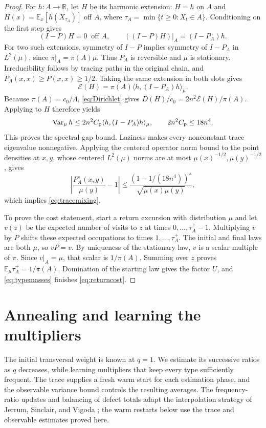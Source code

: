 \documentclass[11pt]{article}
\theoremstyle{definition}
\newcommand{\E}{\mathbb E}
\newcommand{\R}{\mathbb R}
\newcommand{\Var}{\operatorname{Var}}
\newcommand{\calE}{\mathcal E}
\newcommand{\inner}[2]{\langle #1,#2\rangle}
\begin{document}
\begin{proof}
For $h:A\to\R$, let $H$ be its harmonic extension: $H=h$ on $A$ and
$H(x)=\E_x[h(X_{\tau_A})]$ off $A$, where
$\tau_A=\min\{t\ge0:X_t\in A\}$.  Conditioning on the first step gives
\[
 (I-P)H=0\ \text{ off }A,\qquad
 ((I-P)H)|_A=(I-P_A)h.
\]
For two such extensions, symmetry of $I-P$ implies symmetry of
$I-P_A$ in $L^2(\mu)$, since $\pi|_A=\pi(A)\mu$.  Thus $P_A$ is
reversible and $\mu$ is stationary.  Irreducibility follows by tracing
paths in the original chain, and $P_A(x,x)\ge P(x,x)\ge1/2$.
Taking the same extension in both slots gives
\begin{equation}\label{eq:traceenergy}
 \calE(H)=\pi(A)\inner{h}{(I-P_A)h}_\mu.
\end{equation}
Because $\pi(A)=c_0/\Lambda$, \eqref{eq:Dirichlet} gives
$D(H)/c_0=2n^2\calE(H)/\pi(A)$.  Applying
 to $H$ therefore yields
\[
 \Var_\mu h\le2n^2C_{\rm p}\inner{h}{(I-P_A)h}_\mu,
 \qquad 2n^2C_{\rm p}\le18n^4.
\]
This proves the spectral-gap bound.  Laziness makes every nonconstant
trace eigenvalue nonnegative.  Applying the centered operator norm
bound to the point densities at $x,y$, whose centered $L^2(\mu)$ norms
are at most $\mu(x)^{-1/2},\mu(y)^{-1/2}$, gives
\[
 \left|\frac{P_A^s(x,y)}{\mu(y)}-1\right|
 \le\frac{(1-1/(18n^4))^s}{\sqrt{\mu(x)\mu(y)}},
\]
which implies \eqref{eq:tracemixing}.

To prove the cost statement, start a return excursion with distribution
$\mu$ and let $v(z)$ be the expected number of visits to $z$ at times
$0,\ldots,\tau_A^+-1$.  Multiplying $v$ by $P$ shifts these expected
occupations to times $1,\ldots,\tau_A^+$.  The initial and final laws
are both $\mu$, so $vP=v$.  By uniqueness of the stationary law, $v$ is
a scalar multiple of $\pi$.  Since $v|_A=\mu$, that scalar is
$1/\pi(A)$.  Summing over $z$ proves
$\E_\mu\tau_A^+=1/\pi(A)$.  Domination of the starting law gives the
factor $U$, and \eqref{eq:typemasses} finishes \eqref{eq:returncost}.
\end{proof}

\section{Annealing and learning the multipliers}\label{sec:algorithm}

The initial transversal weight is known at $q=1$.  We estimate its
successive ratios as $q$ decreases, while learning multipliers that
keep every type sufficiently frequent.  The trace supplies a fresh
warm start for each estimation phase, and the observable variance
bound controls the resulting averages.
The frequency-ratio updates and balancing of defect totals adapt the
interpolation strategy of Jerrum, Sinclair, and Vigoda \cite{JSV2004};
the warm restarts below use the trace and observable estimates proved here.
\end{document}
